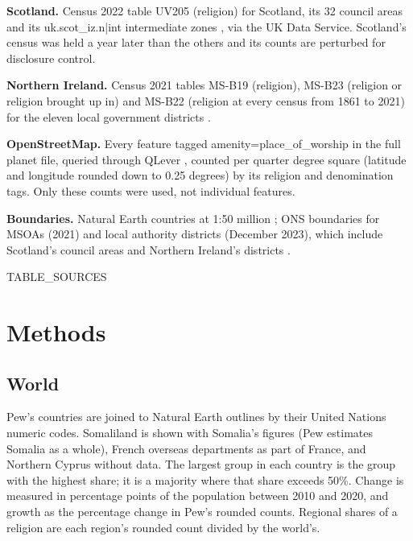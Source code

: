 \documentclass[11pt,a4paper]{article}
\begin{document}
\textbf{Scotland.} Census 2022 table UV205 (religion) for Scotland, its 32 council areas and its {{uk.scot_iz.n|int}} intermediate zones \citep{nrs2022}, via the UK Data Service. Scotland's census was held a year later than the others and its counts are perturbed for disclosure control.

\textbf{Northern Ireland.} Census 2021 tables MS-B19 (religion), MS-B23 (religion or religion brought up in) and MS-B22 (religion at every census from 1861 to 2021) for the eleven local government districts \citep{nisra2021}.

\textbf{OpenStreetMap.} Every feature tagged amenity=place\_of\_worship in the full planet file, queried through QLever \citep{qlever}, counted per quarter degree square (latitude and longitude rounded down to 0.25 degrees) by its religion and denomination tags. Only these counts were used, not individual features.

\textbf{Boundaries.} Natural Earth countries at 1:50 million \citep{naturalearth}; ONS boundaries for MSOAs (2021) and local authority districts (December 2023), which include Scotland's council areas and Northern Ireland's districts \citep{onsgeo}.

{{TABLE_SOURCES}}

\section{Methods}
\subsection{World}
Pew's countries are joined to Natural Earth outlines by their United Nations numeric codes. Somaliland is shown with Somalia's figures (Pew estimates Somalia as a whole), French overseas departments as part of France, and Northern Cyprus without data. The largest group in each country is the group with the highest share; it is a majority where that share exceeds 50\%. Change is measured in percentage points of the population between 2010 and 2020, and growth as the percentage change in Pew's rounded counts. Regional shares of a religion are each region's rounded count divided by the world's.
\end{document}
